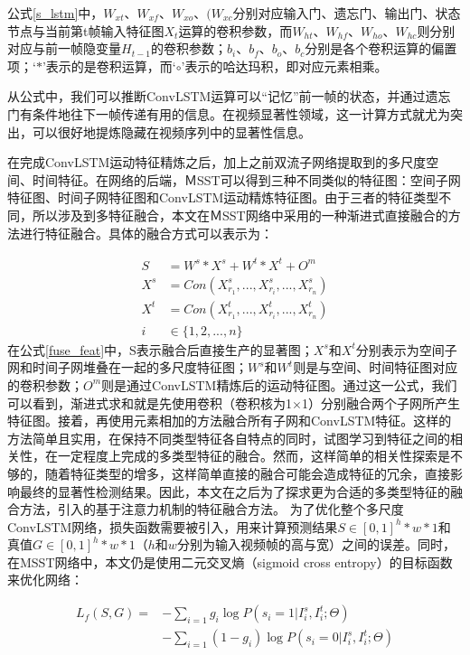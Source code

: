 公式\ref{s_lstm}中，$W_{xt}$、$W_{xf}$、$W_{xo}$、$(W_{xc}$分别对应输入门、遗忘门、输出门、状态节点与当前第t帧输入特征图$X_t$运算的卷积参数，而$W_{ht}$、$W_{hf}$、$W_{ho}$、$W_{hc}$则分别对应与前一帧隐变量$H_{t-1}$的卷积参数；$b_i$、$ b_f$、$ b_o$、$ b_c$分别是各个卷积运算的偏置项；`$*$'表示的是卷积运算，而`$\circ$'表示的哈达玛积，即对应元素相乘。

从公式中，我们可以推断ConvLSTM运算可以“记忆”前一帧的状态，并通过遗忘门有条件地往下一帧传递有用的信息。在视频显著性领域，这一计算方式就尤为突出，可以很好地提炼隐藏在视频序列中的显著性信息。

在完成ConvLSTM运动特征精炼之后，加上之前双流子网络提取到的多尺度空间、时间特征。在网络的后端，ＭSST可以得到三种不同类似的特征图：空间子网特征图、时间子网特征图和ConvLSTM运动精炼特征图。由于三者的特征类型不同，所以涉及到多特征融合，本文在ＭSST网络中采用的一种渐进式直接融合的方法进行特征融合。具体的融合方式可以表示为：

\begin{equation}
\label{fuse_feat}
\begin{aligned}
   S  &= W^s * X^s + W^t * X^t + O^m \\
   X^s &= Con(X^s_{r_1}, ...,X^s_{r_i}, ..., X^s_{r_n}) \\
   X^t &= Con(X^t_{r_1}, ...,X^t_{r_i}, ..., X^t_{r_n}) \\
   i &\in \{1,2,...,n\}
 \end{aligned}
\end{equation}
在公式\ref{fuse_feat}中，S表示融合后直接生产的显著图；$X^s$和$X^t$分别表示为空间子网和时间子网堆叠在一起的多尺度特征图；$W^s$和$W^t$则是与空间、时间特征图对应的卷积参数；$O^m$则是通过ConvLSTM精炼后的运动特征图。通过这一公式，我们可以看到，渐进式求和就是先使用卷积（卷积核为1$\times$1）分别融合两个子网所产生特征图。接着，再使用元素相加的方法融合所有子网和ConvLSTM特征。这样的方法简单且实用，在保持不同类型特征各自特点的同时，试图学习到特征之间的相关性，在一定程度上完成的多类型特征的融合。然而，这样简单的相关性探索是不够的，随着特征类型的增多，这样简单直接的融合可能会造成特征的冗余，直接影响最终的显著性检测结果。因此，本文在之后为了探求更为合适的多类型特征的融合方法，引入的基于注意力机制的特征融合方法。
为了优化整个多尺度ConvLSTM网络，损失函数需要被引入，用来计算预测结果$S\in [0,1]^h*w*1$和真值$G\in [0,1]^h*w*1$（$h$和$w$分别为输入视频帧的高与宽）之间的误差。同时，在MSST网络中，本文仍是使用二元交叉熵（sigmoid cross entropy）的目标函数来优化网络：

\begin{equation}
 \label{loss2}
 \begin{aligned}
   L_f(S, G) = &- \sum_{i=1} g_i \log P(s_i = 1|I^{s}_i, I^{t}_i; \Theta) \\
             &- \sum_{i=1} (1-g_i)\log P(s_i = 0|I^{s}_i, I^{t}_i; \Theta)
   \end{aligned}
\end{equation}

